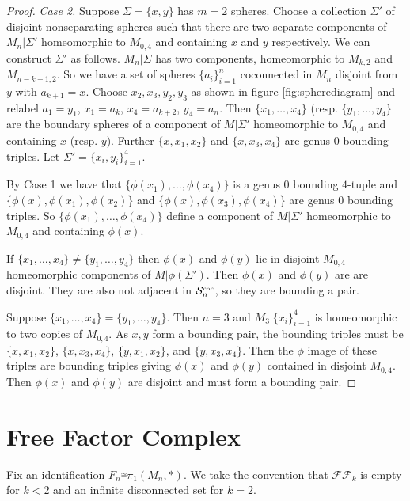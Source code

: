 \documentclass[12pt]{article}
\newcommand{\coc}[1]{{\ensuremath{ \mathcal S^{\mbox{\tiny{coc}}}_{#1} }}}
\begin{document}
\begin{proof}
\medskip \noindent \emph{Case 2.} Suppose $\Sigma=\{x,y\}$ has $m=2$ spheres.
Choose a collection $\Sigma'$ of disjoint nonseparating spheres such that  there are two separate components of $M_n|\Sigma'$ homeomorphic to $M_{0,4}$ and containing $x$ and $y$ respectively.
We can construct $\Sigma'$ as follows.
$M_n|\Sigma$ has two components, homeomorphic to $M_{k,2}$ and $M_{n-k-1,2}$.
So we have a set of spheres $\{a_i\}_{i=1}^n$ coconnected in $M_n$ disjoint from $y$ with $a_{k+1}=x$.
Choose $x_2,x_3,y_2,y_3$ as shown in figure \ref{fig:spherediagram} and relabel $a_1=y_1$, $x_{1}=a_k$, $x_4=a_{k+2}$, $y_4=a_n$. 
Then 
$\{x_1,\ldots, x_4\}$ (resp. $\{y_1, \ldots, y_4\}$ are the boundary spheres of a component of $M|\Sigma'$ homeomorphic to $M_{0,4}$ and containing $x$ (resp. $y$).
Further $\{x,x_1,x_2\}$ and $\{x,x_3,x_4\}$ are genus 0 bounding triples. Let $\Sigma' =\{x_i,y_i\}_{i=1}^4$.



By Case 1 we have that $\{\phi(x_1), \ldots, \phi(x_4)\}$ is a genus 0 bounding $4$-tuple and $\{\phi(x),\phi(x_1),\phi(x_2)\}$ and $\{\phi(x),\phi(x_3),\phi(x_4)\}$ are genus 0 bounding triples. 
So $\{\phi(x_1), \ldots, \phi(x_4)\}$ define a component of $M|\Sigma'$ homeomorphic to $M_{0,4}$ and containing $\phi(x)$.

If $\{x_1, \ldots, x_4\} \neq \{y_1, \ldots, y_4\}$ then 
 $\phi(x)$ and $\phi(y)$ lie in disjoint $M_{0,4}$ homeomorphic components of $M|\phi(\Sigma')$.
Then  $\phi(x)$ and $\phi(y)$ are are disjoint. They are also not adjacent in $\coc n$, so they are bounding a pair.

Suppose $\{x_1, \ldots, x_4\} = \{y_1, \ldots, y_4\}$.
Then $n=3$ and $M_3|\{x_i\}_{i=1}^4$ is homeomorphic to two copies of $M_{0,4}$.
As $x,y$ form a bounding pair, the bounding triples must be
$\{x,x_1,x_2\}$, $\{x,x_3,x_4\}$, $\{y,x_1,x_2\}$, and $\{y,x_3,x_4\}$.
Then the $\phi$ image of these triples are
bounding triples giving $\phi(x)$ and $\phi(y)$ contained in disjoint $M_{0,4}$.
Then $\phi(x)$ and $\phi(y)$ are disjoint and must form a bounding pair.
\end{proof}

\newpage
\section{Free Factor Complex}


Fix an identification $F_n \stackrel{\cong}{} \pi_1(M_n,\ast)$.
We take the convention that $\mathcal{FF}_k$ is empty for $k<2$ and an infinite disconnected set for $k=2$.
\end{document}
